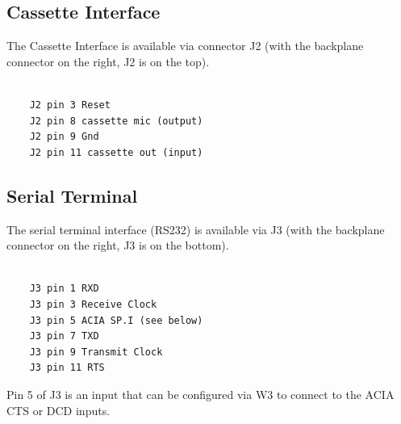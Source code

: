 \subsection{Cassette Interface}

The Cassette Interface is available via connector J2 (with the backplane connector on the right, J2 is on the top).

\begin{verbatim}

    J2 pin 3 Reset
    J2 pin 8 cassette mic (output)
    J2 pin 9 Gnd
    J2 pin 11 cassette out (input) 

\end{verbatim}

\subsection{Serial Terminal} 

The serial terminal interface (RS232) is available via J3 (with the backplane connector on the right, J3 is on the bottom).

\begin{verbatim}

    J3 pin 1 RXD
    J3 pin 3 Receive Clock
    J3 pin 5 ACIA SP.I (see below)
    J3 pin 7 TXD
    J3 pin 9 Transmit Clock
    J3 pin 11 RTS

\end{verbatim}

Pin 5 of J3 is an input that can be configured via W3 to connect to the ACIA CTS or DCD inputs.

